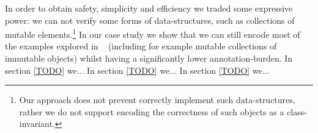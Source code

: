 In order to obtain safety, simplicity and efficiency we traded some expressive power:
we can not verify some forms of data-structures, such as collections of mutable elements.\footnote{Our approach does not prevent correctly implement such data-structures, rather we do not support encoding the correctness of such objects as a class-invariant.}
In our case study we show that
we can still encode most of the examples explored in ~\cite{???} (including for example mutable collections of immutable objects) whilst having a significantly lower annotation-burden.
In section \ref{TODO} we...
In section \ref{TODO} we...
In section \ref{TODO} we...

